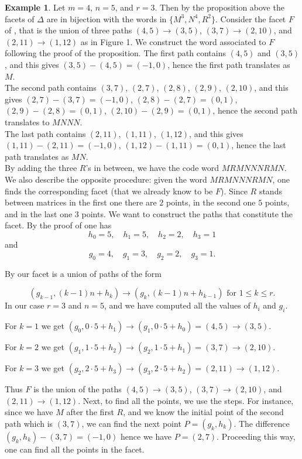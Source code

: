 \documentclass[12pt]{amsart}
\numberwithin{equation}{section}
\theoremstyle{definition}
\newtheorem{example}[theorem]{Example}
\begin{document}
\begin{example}
Let $m=4$, $n=5$, and $r=3$. Then by the proposition above the facets of $\Delta$ are in bijection with the words in $\{M^{3},N^{4}, R^{2}\}$. 
Consider the facet $F$ of , that is the union of three paths  $(4,5)\longrightarrow (3,5)$, $(3,7)\longrightarrow (2,10)$, and $(2,11)\longrightarrow (1,12)$ as in Figure 1. We construct the word associated to $F$ following the proof of the proposition. 
The first path contains $(4,5)$ and $(3,5)$, and this gives $(3,5)-(4,5)=(-1,0)$, hence the first path translates as $M$.\\
The second path contains $(3,7)$, $(2,7)$, $(2,8)$, $(2,9)$, $(2,10)$, and this gives $(2,7)-(3,7)=(-1,0)$, $(2,8)-(2,7)=(0,1)$, $(2,9)-(2,8)=(0,1)$, $(2,10)-(2,9)=(0,1)$, hence the second path translates to $MNNN$.\\
The last path contains $(2,11)$, $(1,11)$, $(1,12)$, and this gives $(1,11)-(2,11)=(-1,0)$, $(1,12)-(1,11)=(0,1)$, hence the last path translates as $MN$.\\
By adding the three $R$'s in between, we have the code word $MRMNNNRMN$.\\

We also describe the opposite procedure: given the word $MRMNNNRMN$, one finds the corresponding facet (that we already know to be $F$). Since $R$ stands between matrices in the first one there are $2$ points, in the second one  $5$ points, and in the last one $3$ points.
We want to construct the paths that constitute the facet. 
By the proof of  one has $$h_0=5,\quad h_1=5,\quad h_2=2, \quad h_3=1$$
and 
$$g_0=4,\quad g_1=3,\quad g_2=2, \quad g_3=1.$$

By  our facet is a union of paths of the  form

\[
  	(g_{k-1}, (k-1)n+h_{k}) \longrightarrow (g_{k},(k-1)n+h_{k-1}) \mbox{ for $1\leq k\leq r$.}
\]  
In our case $r=3$ and $n=5$, and we have computed all the values of $h_i$ and $g_i$.

For $k=1$ we get $(g_0, 0\cdot5+h_1)\longrightarrow (g_1, 0\cdot5+h_0)=(4,5)\longrightarrow (3,5)$.

For $k=2$ we get $(g_1, 1\cdot5+h_2)\longrightarrow (g_2, 1\cdot5+h_1)=(3,7)\longrightarrow (2,10)$.

For $k=3$ we get $(g_2, 2\cdot5+h_3)\longrightarrow (g_3, 2\cdot5+h_2)=(2,11)\longrightarrow (1,12)$.





Thus $F$ is the union of the paths $(4,5)\longrightarrow (3,5)$, $(3,7)\longrightarrow (2,10)$, and $(2,11)\longrightarrow (1,12)$. Next, to find all the points, we use the steps. For instance, since we have $M$ after the first $R$, and we know the initial point of the second path which is $(3,7)$, we can find the next point $P=(g_k,h_k)$. The difference $(g_k,h_k)-(3,7)=(-1,0)$ hence we have $P=(2,7)$. Proceeding this way, one can find all the points in the facet.
\end{example}
\end{document}
